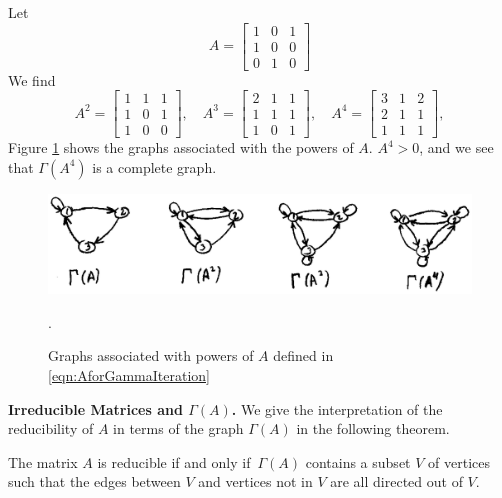 \begin{xexample}
Let
\begin{equation}
  A = \begin{bmatrix}
           1 & 0 & 1 \\ 1 & 0 & 0 \\ 0 & 1 & 0
      \end{bmatrix}
\label{eqn:AforGammaIteration}
\end{equation}
We find
\begin{equation}
   A^2 = \begin{bmatrix}
            1 & 1 & 1 \\ 1 & 0 & 1 \\ 1 & 0 & 0
         \end{bmatrix},
   \quad
   A^3 = \begin{bmatrix}
            2 & 1 & 1 \\ 1 & 1 & 1 \\ 1 & 0 & 1
         \end{bmatrix},
   \quad
   A^4 = \begin{bmatrix}
            3 & 1 & 2 \\ 2 & 1 & 1 \\ 1 & 1 & 1
         \end{bmatrix},
\end{equation}
Figure \ref{fig:GammaIteration} shows the graphs associated
with the powers of $A$.  $A^4 > 0$, and we see that
$\Gamma(A^4)$ is a complete graph.
\end{xexample}

\begin{figure}
\centerline{\includegraphics[width=4.5in]{images/GammaIteration.ps}}
\caption{Graphs associated with powers of $A$ defined in \eqref{eqn:AforGammaIteration}}.
\label{fig:GammaIteration}
\end{figure}

\medskip
\noindent
\textbf{Irreducible Matrices and $\Gamma(A)$.}
We give the interpretation of the reducibility of $A$ in terms of the graph $\Gamma(A)$
in the following theorem.

\begin{theorem}
\label{thm:irredgraphtest}
The matrix $A$ is reducible if and only if $\,\Gamma(A)$ contains a subset
$V$ of vertices such that the
edges between $V$ and vertices not in $V$
are all directed out of $V$.
\end{theorem}

